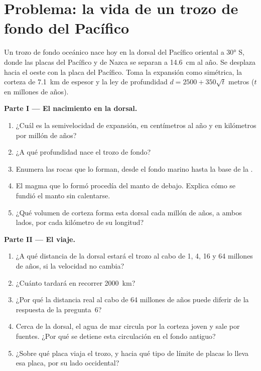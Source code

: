 \section{Problema: la vida de un trozo de fondo del Pacífico}

\begin{problem}
\label{pb:g11:ocean-ridges:1}
Un trozo de fondo oceánico nace hoy en la dorsal del Pacífico oriental a
\ang{30} S, donde las placas del Pacífico y de Nazca se separan a
\qty{14.6}{cm} al año. Se desplaza hacia el oeste con la placa del Pacífico.
Toma la expansión como simétrica, la corteza de \qty{7.1}{km} de espesor y la
ley de profundidad $d = 2500 + 350\sqrt{t}$ metros ($t$ en millones de años).

\medskip
\noindent\textbf{Parte I --- El nacimiento en la dorsal.}
\begin{enumerate}
  \item ¿Cuál es la semivelocidad de expansión, en centímetros al año y en
        kilómetros por millón de años?
  \item ¿A qué profundidad nace el trozo de fondo?
  \item Enumera las rocas que lo forman, desde el fondo marino hasta la base
        de la .
  \item El magma que lo formó procedía del manto de debajo. Explica cómo se
        fundió el manto sin calentarse.
  \item ¿Qué volumen de corteza forma esta dorsal cada millón de años, a
        ambos lados, por cada kilómetro de su longitud?
\end{enumerate}

\medskip
\noindent\textbf{Parte II --- El viaje.}
\begin{enumerate}[resume]
  \item ¿A qué distancia de la dorsal estará el trozo al cabo de 1, 4, 16 y 64
        millones de años, si la velocidad no cambia?
  \item ¿Cuánto tardará en recorrer \qty{2000}{km}?
  \item ¿Por qué la distancia real al cabo de 64 millones de años puede
        diferir de la respuesta de la pregunta~6?
  \item Cerca de la dorsal, el agua de mar circula por la corteza joven y
        sale por fuentes. ¿Por qué se detiene esta circulación en el fondo antiguo?
  \item ¿Sobre qué placa viaja el trozo, y hacia qué tipo de límite de placas
        lo lleva esa placa, por su lado occidental?
\end{enumerate}


\end{problem}
